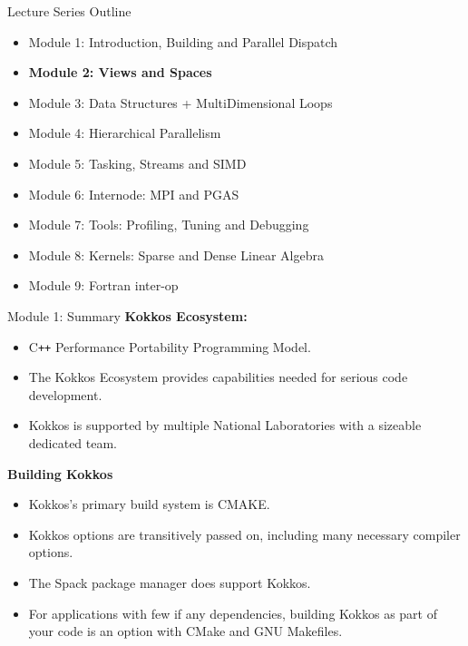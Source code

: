 \begin{frame}{Lecture Series Outline}

\begin{itemize}
        \item Module 1: Introduction, Building and Parallel Dispatch
        \item \textbf{Module 2: Views and Spaces}
        \item Module 3: Data Structures + MultiDimensional Loops
        \item Module 4: Hierarchical Parallelism
        \item Module 5: Tasking, Streams and SIMD
        \item Module 6: Internode: MPI and PGAS
        \item Module 7: Tools: Profiling, Tuning and Debugging
        \item Module 8: Kernels: Sparse and Dense Linear Algebra
        \item Module 9: Fortran inter-op
\end{itemize}
\end{frame}

\begin{frame}{Module 1: Summary}
	\textbf{Kokkos Ecosystem:}
	\begin{itemize}
		\item C\texttt{++} Performance Portability Programming Model.
		\item The Kokkos Ecosystem provides capabilities needed for serious code development.
		\item Kokkos is supported by multiple National Laboratories with a sizeable dedicated team.
	\end{itemize}

	\textbf{Building Kokkos}
	\begin{itemize}
    \item{Kokkos's primary build system is CMAKE.}
    \item{Kokkos options are transitively passed on, including many necessary compiler options.}
    \item{The Spack package manager does support Kokkos.}
    \item{For applications with few if any dependencies, building Kokkos as part of your code is an option with CMake and GNU Makefiles.}
	\end{itemize}
\end{frame}

